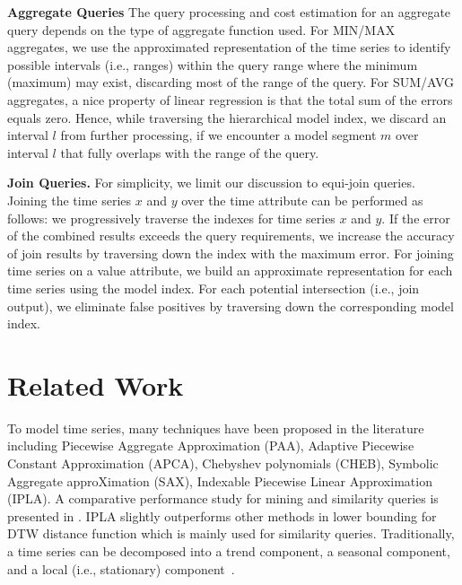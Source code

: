 \documentclass{sigmod}
\begin{document}
{\bf Aggregate Queries}
The query processing and cost estimation for an aggregate query depends on the type of aggregate function used.
For MIN/MAX aggregates, we use the approximated representation of the time series to  identify  possible intervals (i.e., ranges) within the query range where the  minimum (maximum) may exist, 
discarding most of the range of the query.
For SUM/AVG aggregates,  a nice property of linear regression is that the total sum of the errors equals zero. Hence, while traversing the hierarchical model index, we discard an interval $l$ from further processing, if we encounter a model segment $m$ over interval $l$ that fully overlaps with the range of the query.

{\bf Join Queries.}
For simplicity, we limit our discussion to equi-join queries. 
Joining the time series $x$ and $y$ over the time attribute can be performed as follows: we progressively traverse the indexes for time series $x$ and  $y$. If the error of the combined results exceeds the query requirements, we increase the accuracy of join results by traversing down the index  with the maximum error.
 For joining time series on a value attribute, we build an approximate representation for each time series using the model index.  
For each potential intersection (i.e., join output), we eliminate false positives by traversing down the corresponding model index.

\section{Related Work}
\label{sec:related}
To model time series, many techniques have been proposed in the literature including Piecewise Aggregate Approximation (PAA), Adaptive Piecewise Constant Approximation (APCA), Chebyshev polynomials (CHEB), Symbolic Aggregate approXimation (SAX), Indexable Piecewise Linear Approximation (IPLA).    A comparative performance study for mining and similarity  queries is presented in \cite{DTPE08}. IPLA slightly  outperforms other methods in lower bounding for DTW distance function which is mainly used for similarity queries. 
Traditionally, a time series  can be decomposed into a trend component, a seasonal component, and a local (i.e., stationary) component~\cite{Decompose}. 
\end{document}
